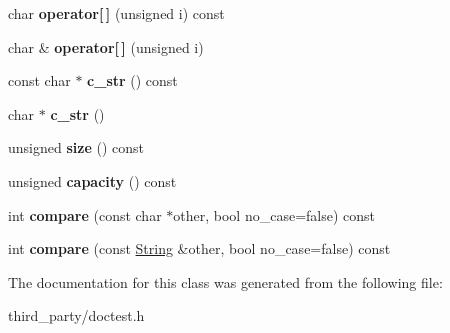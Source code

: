 \begin{DoxyCompactItemize}
\item 
\mbox{\label{classdoctest_1_1_string_adf69290bc23e8c7bf60a9bcf765ebc10}} 
char {\bfseries operator\mbox{[}$\,$\mbox{]}} (unsigned i) const
\item 
\mbox{\label{classdoctest_1_1_string_acd37c72485c1277fc673f6b328138b40}} 
char \& {\bfseries operator\mbox{[}$\,$\mbox{]}} (unsigned i)
\item 
\mbox{\label{classdoctest_1_1_string_a607c6977b193fecf29622110e6081625}} 
const char $\ast$ {\bfseries c\+\_\+str} () const
\item 
\mbox{\label{classdoctest_1_1_string_a35df67f11652bcc568ad3af470c344c0}} 
char $\ast$ {\bfseries c\+\_\+str} ()
\item 
\mbox{\label{classdoctest_1_1_string_a9fbc7b09f1660b236f12fc2adce6183d}} 
unsigned {\bfseries size} () const
\item 
\mbox{\label{classdoctest_1_1_string_adad8703f08950d173d2cb1426391fcdf}} 
unsigned {\bfseries capacity} () const
\item 
\mbox{\label{classdoctest_1_1_string_aef87d1f106d32d8c31af87335b44164d}} 
int {\bfseries compare} (const char $\ast$other, bool no\+\_\+case=false) const
\item 
\mbox{\label{classdoctest_1_1_string_adb57becb56e054d981e7c2b967a7e359}} 
int {\bfseries compare} (const \mbox{\hyperlink{classdoctest_1_1_string}{String}} \&other, bool no\+\_\+case=false) const
\end{DoxyCompactItemize}


The documentation for this class was generated from the following file\+:\begin{DoxyCompactItemize}
\item 
third\+\_\+party/doctest.\+h\end{DoxyCompactItemize}
